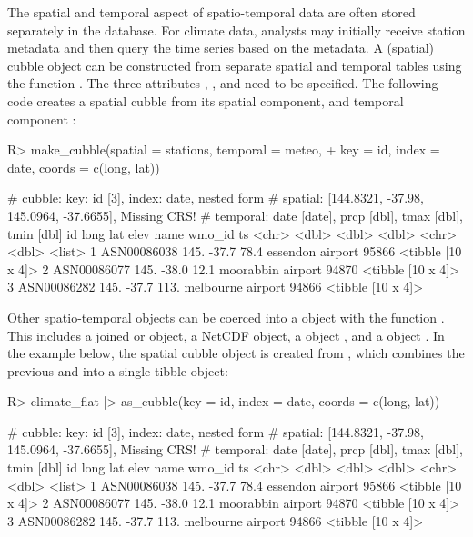 \documentclass[
  shortnames]{jss}
\begin{document}
The spatial and temporal aspect of spatio-temporal data are often stored separately in the database. For climate data, analysts may initially receive station metadata and then query the time series based on the metadata. A (spatial) cubble object can be constructed from separate spatial and temporal tables using the function . The three attributes , , and  need to be specified. The following code creates a spatial cubble from its spatial component,  and temporal component :

\begin{CodeChunk}
\begin{CodeInput}
R> make_cubble(spatial = stations, temporal = meteo,
+             key = id, index = date, coords = c(long, lat))
\end{CodeInput}
\begin{CodeOutput}
# cubble:   key: id [3], index: date, nested form
# spatial:  [144.8321, -37.98, 145.0964, -37.6655], Missing CRS!
# temporal: date [date], prcp [dbl], tmax [dbl], tmin [dbl]
  id           long   lat  elev name              wmo_id ts               
  <chr>       <dbl> <dbl> <dbl> <chr>              <dbl> <list>           
1 ASN00086038  145. -37.7  78.4 essendon airport   95866 <tibble [10 x 4]>
2 ASN00086077  145. -38.0  12.1 moorabbin airport  94870 <tibble [10 x 4]>
3 ASN00086282  145. -37.7 113.  melbourne airport  94866 <tibble [10 x 4]>
\end{CodeOutput}
\end{CodeChunk}

Other  spatio-temporal objects can be coerced into a  object with the function . This includes a joined  or  object, a NetCDF object, a  object \citep{stars}, and a  object \citep{sftime}. In the example below, the spatial cubble object is created from , which combines the previous  and  into a single tibble object:

\begin{CodeChunk}
\begin{CodeInput}
R> climate_flat |> as_cubble(key = id, index = date, coords = c(long, lat))
\end{CodeInput}
\begin{CodeOutput}
# cubble:   key: id [3], index: date, nested form
# spatial:  [144.8321, -37.98, 145.0964, -37.6655], Missing CRS!
# temporal: date [date], prcp [dbl], tmax [dbl], tmin [dbl]
  id           long   lat  elev name              wmo_id ts               
  <chr>       <dbl> <dbl> <dbl> <chr>              <dbl> <list>           
1 ASN00086038  145. -37.7  78.4 essendon airport   95866 <tibble [10 x 4]>
2 ASN00086077  145. -38.0  12.1 moorabbin airport  94870 <tibble [10 x 4]>
3 ASN00086282  145. -37.7 113.  melbourne airport  94866 <tibble [10 x 4]>
\end{CodeOutput}
\end{CodeChunk}
\end{document}
